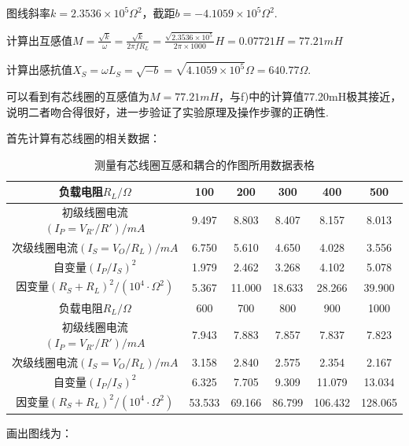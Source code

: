 \documentclass[UTF8]{ctexart}
\begin{document}
图线斜率$k=2.3536\times 10^5\Omega^2$，截距$b=-4.1059\times 10^5\Omega^2$.\\ \par
计算出互感值$\displaystyle{M=\frac{\sqrt{k}}{\omega}=\frac{\sqrt{k}}{2\pi f R_L}}=\frac{\sqrt{2.3536\times 10^5}}{2\pi \times 1000}H=0.07721H=77.21mH$\par
计算出感抗值$\displaystyle{X_S=\omega L_S=\sqrt{-b}=\sqrt{4.1059\times 10^5}}\Omega=640.77\Omega$.
\par
可以看到有芯线圈的互感值为$M=77.21mH$，与f)中的计算值77.20mH极其接近，说明二者吻合得很好，进一步验证了实验原理及操作步骤的正确性.

首先计算有芯线圈的相关数据：
\begin{table}[H]\begin{center}
    \caption{测量有芯线圈互感和耦合的作图所用数据表格}
    \begin{tabular}{|c|c|c|c|c|c|}
        \hline
        负载电阻$R_L/\Omega$&100&200&300&400&500\\
        \hline
        初级线圈电流$(I_P=V_{R'}/R')/mA$&9.497&8.803&8.407&8.157&8.013\\
        \hline
        次级线圈电流$(I_S=V_{O}/R_L)/mA$&6.750&5.610&4.650&4.028&3.556\\
        \hline
        自变量$(I_P/I_S)^2$&1.979&2.462&3.268&4.102&5.078\\
        \hline
        因变量$(R_S+R_L)^2/(10^4\cdot\Omega^2)$&5.367&11.000&18.633&28.266&39.900\\
        \hline
        \hline
        负载电阻$R_L/\Omega$&600&700&800&900&1000\\
        \hline
        初级线圈电流$(I_P=V_{R'}/R')/mA$&7.943&7.883&7.857&7.837&7.823\\
        \hline
        次级线圈电流$(I_S=V_{O}/R_L)/mA$&3.158&2.840&2.575&2.354&2.167\\
        \hline
        自变量$(I_P/I_S)^2$&6.325&7.705&9.309&11.079&13.034\\
        \hline
        因变量$(R_S+R_L)^2/(10^4\cdot\Omega^2)$&53.533&69.166&86.799&106.432&128.065\\
        \hline
    \end{tabular}
\restoregeometry
\end{center}\end{table}
画出图线为：
\end{document}

